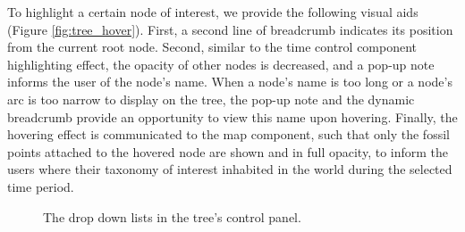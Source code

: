\documentclass[11pt, a4paper,oneside,chapterprefix=false]{scrbook}
\begin{document}
To highlight a certain node of interest, we provide the following visual aids (Figure \ref{fig:tree_hover}). First, a second line of breadcrumb indicates its position from the current root node. Second, similar to the time control component highlighting effect, the opacity of other nodes is decreased, and a pop-up note informs the user of the node's name. When a node's name is too long or a node's arc is too narrow to display on the tree, the pop-up note and the dynamic breadcrumb provide an opportunity to view this name upon hovering. Finally, the hovering effect is communicated to the map component, such that only the fossil points attached to the hovered node are shown and in full opacity, to inform the users where their taxonomy of interest inhabited in the world during the selected time period. \\

\begin{figure}[h]
	\centering
	\hfill
	\caption{The drop down lists in the tree's control panel.}
	\label{fig:tree_dropdown}
\end{figure}
\end{document}
